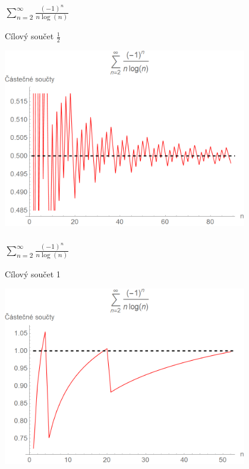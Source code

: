 \documentclass{beamer}
\begin{document}
\begin{frame}
  \frametitle{\(\sum _{n=2} ^{\infty} \frac{(-1)^{n}}{n\log(n)}\)}
  Cílový součet \(\frac{1}{2}\)
  \begin{center}
    \includegraphics[width=0.8\textwidth]{serie2_1.png}
  \end{center}
\end{frame}

\begin{frame}
  \frametitle{\(\sum _{n=2} ^{\infty} \frac{(-1)^{n}}{n\log(n)}\)}
  Cílový součet 1
  \begin{center}
    \includegraphics[width=0.8\textwidth]{serie2_2.png}
  \end{center}
\end{frame}
\end{document}
